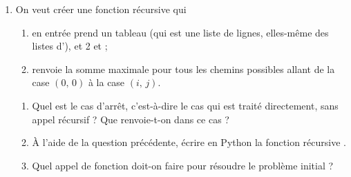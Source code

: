 \documentclass[a4paper,12pt,french]{article}
\begin{document}
\begin{enumerate}[\bfseries 1.]
     \item On veut créer une fonction récursive  qui
     \begin{enumerate}[--]
     	\item 	en entrée prend un tableau  (qui est une liste de lignes, elles-même des listes d'), et 2  et ;
     	\item 	renvoie la somme maximale pour tous les chemins possibles allant de la case $(0,\,0)$ à la case $(i,\,j)$.
      \end{enumerate}
      \begin{enumerate}[\bfseries a.]
        \item Quel est le cas d'arrêt, c'est-à-dire le cas qui est traité directement, sans appel récursif ? Que renvoie-t-on dans ce cas ?
        \item À l'aide de la question précédente, écrire en Python la fonction récursive .
        \item Quel appel de fonction doit-on faire pour résoudre le problème initial ?
     \end{enumerate}
\end{enumerate}
\end{document}
